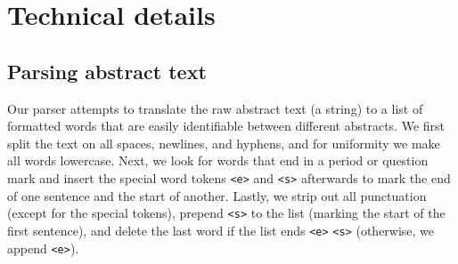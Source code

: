 \documentclass{article}
\begin{document}






\appendix
\section{Technical details} \label{app:details}
\subsection{Parsing abstract text} \label{app:parsing}
Our parser attempts to translate the raw abstract text (a string) to a list of formatted words that are easily identifiable between different abstracts.
We first split the text on all spaces, newlines, and hyphens, and for uniformity we make all words lowercase.
Next, we look for words that end in a period or question mark and insert the special word tokens \texttt{<e>} and \texttt{<s>} afterwards to mark the end of one sentence and the start of another.
Lastly, we strip out all punctuation (except for the special tokens), prepend \texttt{<s>} to the list (marking the start of the first sentence), and delete the last word if the list ends \texttt{<e>} \texttt{<s>} (otherwise, we append \texttt{<e>}).
\end{document}
